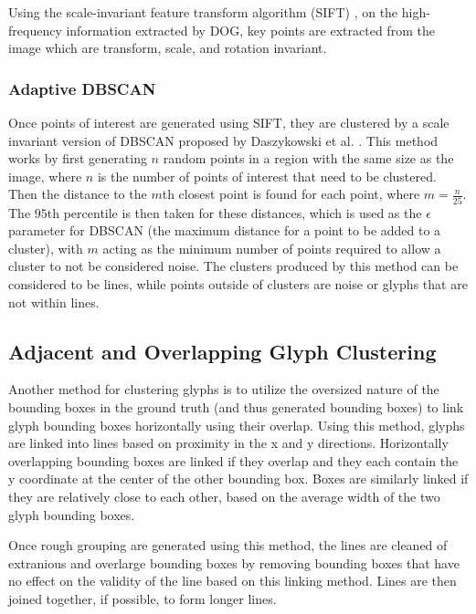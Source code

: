 Using the scale-invariant feature transform algorithm (SIFT) \cite{Lowe}, on the high-frequency information extracted by DOG, key points are extracted from the image which are transform, scale, and rotation invariant.


\subsubsection{Adaptive DBSCAN}
Once points of interest are generated using SIFT, they are clustered by a scale invariant version of DBSCAN proposed by Daszykowski et al. \cite{Daszykowski}. This method works by first generating $n$ random points in a region with the same size as the image, where $n$ is the number of points of interest that need to be clustered. Then the distance to the $m$th closest point is found for each point, where $m = \frac{n}{25}$. The $95$th percentile is then taken for these distances, which is used as the $\epsilon$ parameter for DBSCAN (the maximum distance for a point to be added to a cluster), with $m$ acting as the minimum number of points required to allow a cluster to not be considered noise. The clusters produced by this method can be considered to be lines, while points outside of clusters are noise or glyphs that are not within lines.

\subsection{Adjacent and Overlapping Glyph Clustering}

Another method for clustering glyphs is to utilize the oversized nature of the bounding boxes in the ground truth (and thus generated bounding boxes) to link glyph bounding boxes horizontally using their overlap. Using this method, glyphs are linked into lines based on proximity in the x and y directions. Horizontally overlapping bounding boxes are linked if they overlap and they each contain the y coordinate at the center of the other bounding box. Boxes are similarly linked if they are relatively close to each other, based on the average width of the two glyph bounding boxes.

Once rough grouping are generated using this method, the lines are cleaned of extranious and overlarge bounding boxes by removing bounding boxes that have no effect on the validity of the line based on this linking method. Lines are then joined together, if possible, to form longer lines.

